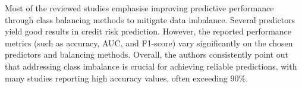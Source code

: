     Most of the reviewed studies emphasise improving predictive performance through class balancing methods to mitigate data imbalance. Several predictors yield good results in credit risk prediction. However, the reported performance metrics (such as accuracy, AUC, and F1-score) vary significantly on the chosen predictors and balancing methods. Overall, the authors consistently point out that addressing class imbalance is crucial for achieving reliable predictions, with many studies reporting high accuracy values, often exceeding 90\%. %

